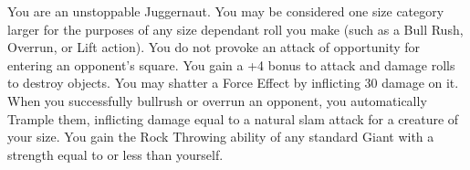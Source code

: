 \combatfeat
{You are an unstoppable Juggernaut.}
{You may be considered one size category larger for the purposes of any size dependant roll you make (such as a Bull Rush, Overrun, or Lift action).}
{You do not provoke an attack of opportunity for entering an opponent's square.}
{You gain a +4 bonus to attack and damage rolls to destroy objects. You may shatter a Force Effect by inflicting 30 damage on it.}
{When you successfully bullrush or overrun an opponent, you automatically Trample them, inflicting damage equal to a natural slam attack for a creature of your size.}
{You gain the Rock Throwing ability of any standard Giant with a strength equal to or less than yourself.}